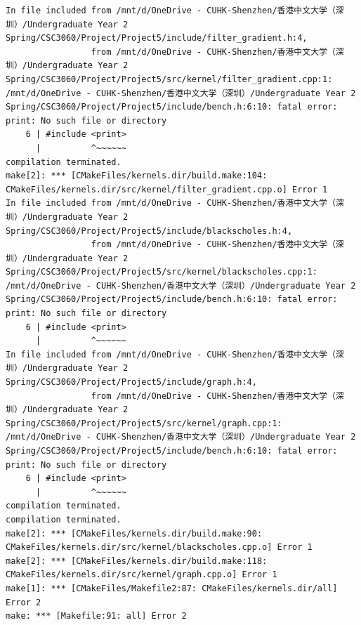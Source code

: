 \documentclass[11pt, a4paper]{article}
\begin{document}
\begin{userbox}
\begin{verbatim}
In file included from /mnt/d/OneDrive - CUHK-Shenzhen/香港中文大学（深圳）/Undergraduate Year 2 Spring/CSC3060/Project/Project5/include/filter_gradient.h:4,
                 from /mnt/d/OneDrive - CUHK-Shenzhen/香港中文大学（深圳）/Undergraduate Year 2 Spring/CSC3060/Project/Project5/src/kernel/filter_gradient.cpp:1:       
/mnt/d/OneDrive - CUHK-Shenzhen/香港中文大学（深圳）/Undergraduate Year 2 Spring/CSC3060/Project/Project5/include/bench.h:6:10: fatal error: print: No such file or directory
    6 | #include <print>
      |          ^~~~~~~
compilation terminated.
make[2]: *** [CMakeFiles/kernels.dir/build.make:104: CMakeFiles/kernels.dir/src/kernel/filter_gradient.cpp.o] Error 1
In file included from /mnt/d/OneDrive - CUHK-Shenzhen/香港中文大学（深圳）/Undergraduate Year 2 Spring/CSC3060/Project/Project5/include/blackscholes.h:4,
                 from /mnt/d/OneDrive - CUHK-Shenzhen/香港中文大学（深圳）/Undergraduate Year 2 Spring/CSC3060/Project/Project5/src/kernel/blackscholes.cpp:1:
/mnt/d/OneDrive - CUHK-Shenzhen/香港中文大学（深圳）/Undergraduate Year 2 Spring/CSC3060/Project/Project5/include/bench.h:6:10: fatal error: print: No such file or directory
    6 | #include <print>
      |          ^~~~~~~
In file included from /mnt/d/OneDrive - CUHK-Shenzhen/香港中文大学（深圳）/Undergraduate Year 2 Spring/CSC3060/Project/Project5/include/graph.h:4,
                 from /mnt/d/OneDrive - CUHK-Shenzhen/香港中文大学（深圳）/Undergraduate Year 2 Spring/CSC3060/Project/Project5/src/kernel/graph.cpp:1:
/mnt/d/OneDrive - CUHK-Shenzhen/香港中文大学（深圳）/Undergraduate Year 2 Spring/CSC3060/Project/Project5/include/bench.h:6:10: fatal error: print: No such file or directory
    6 | #include <print>
      |          ^~~~~~~
compilation terminated.
compilation terminated.
make[2]: *** [CMakeFiles/kernels.dir/build.make:90: CMakeFiles/kernels.dir/src/kernel/blackscholes.cpp.o] Error 1
make[2]: *** [CMakeFiles/kernels.dir/build.make:118: CMakeFiles/kernels.dir/src/kernel/graph.cpp.o] Error 1
make[1]: *** [CMakeFiles/Makefile2:87: CMakeFiles/kernels.dir/all] Error 2
make: *** [Makefile:91: all] Error 2
\end{verbatim}
\end{userbox}
\end{document}
